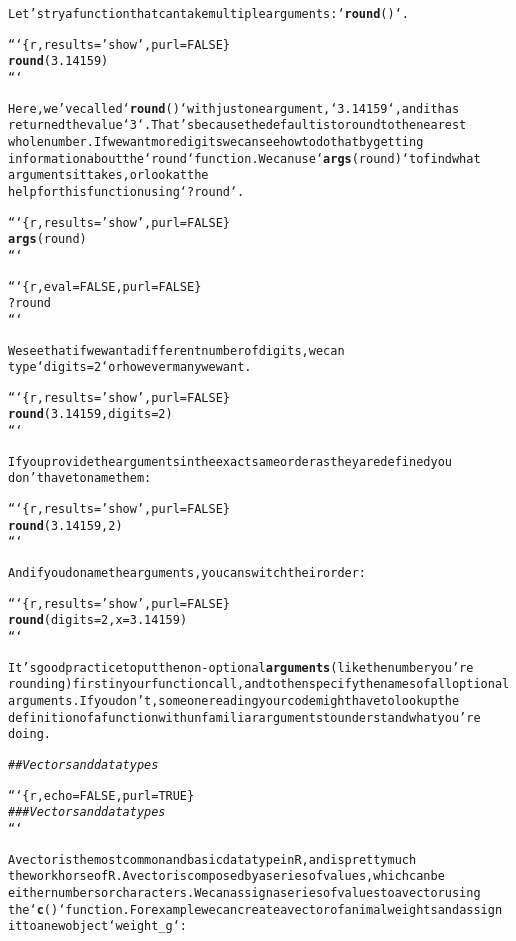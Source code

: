 \documentclass{article}\usepackage[]{graphicx}\usepackage[]{xcolor}
\makeatletter
\newcommand{\hlstr}[1]{\textcolor[rgb]{0.192,0.494,0.8}{#1}}%
\newcommand{\hlcom}[1]{\textcolor[rgb]{0.678,0.584,0.686}{\textit{#1}}}%
\newcommand{\hlkwd}[1]{\textcolor[rgb]{0.737,0.353,0.396}{\textbf{#1}}}%
\newenvironment{kframe}{%
 \def\at@end@of@kframe{}%
 \ifinner\ifhmode%
  \def\at@end@of@kframe{\end{minipage}}%
  \begin{minipage}{\columnwidth}%
 \fi\fi%
 \def\FrameCommand##1{\hskip\@totalleftmargin \hskip-\fboxsep
 \colorbox{shadecolor}{##1}\hskip-\fboxsep
     \hskip-\linewidth \hskip-\@totalleftmargin \hskip\columnwidth}%
 \MakeFramed {\advance\hsize-\width
   \@totalleftmargin\z@ \linewidth\hsize
   \@setminipage}}%
 {\par\unskip\endMakeFramed%
 \at@end@of@kframe}
\newenvironment{knitrout}{}{} %
\makeatother
\begin{document}
\begin{knitrout}
\begin{kframe}
\begin{alltt}
Let's try a function that can take multiple arguments: `\hlkwd{round}()`.

```\{r, results = \hlstr{'show'}, purl = FALSE\}
\hlkwd{round}(3.14159)
```

Here, we've called `\hlkwd{round}()` with just one argument, `3.14159`, and it has
returned the value `3`.  That's because the default is to round to the nearest
whole number. If we want more digits we can see how to do that by getting
information about the `round` function.  We can use `\hlkwd{args}(round)` to find what
arguments it takes, or look at the
help for this function using `?round`.

```\{r, results = \hlstr{'show'}, purl = FALSE\}
\hlkwd{args}(round)
```

```\{r, eval = FALSE, purl = FALSE\}
?round
```

We see that if we want a different number of digits, we can
type `digits = 2` or however many we want.

```\{r, results = \hlstr{'show'}, purl = FALSE\}
\hlkwd{round}(3.14159, digits = 2)
```

If you provide the arguments in the exact same order as they are defined you
don't have to name them:

```\{r, results = \hlstr{'show'}, purl = FALSE\}
\hlkwd{round}(3.14159, 2)
```

And if you do name the arguments, you can switch their order:

```\{r, results = \hlstr{'show'}, purl = FALSE\}
\hlkwd{round}(digits = 2, x = 3.14159)
```

It\hlstr{'s good practice to put the non-optional \hlkwd{arguments} (like the number you'}re
rounding) first in your function call, and to then specify the names of all optional
arguments.  If you don't, someone reading your code might have to look up the
definition of a function with unfamiliar arguments to understand what you're
doing.


\hlcom{## Vectors and data types}

```\{r, echo = FALSE, purl = TRUE\}
\hlcom{### Vectors and data types}
```

A vector is the most common and basic data type in R, and is pretty much
the workhorse of R. A vector is composed by a series of values, which can be
either numbers or characters. We can assign a series of values to a vector using
the `\hlkwd{c}()` function. For example we can create a vector of animal weights and assign
it to a new object `weight_g`:


\end{alltt}
\end{kframe}
\end{knitrout}
\end{document}
